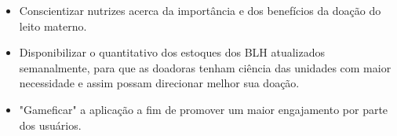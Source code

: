 \begin{itemize}
  \item Conscientizar nutrizes acerca da importância e dos benefícios da doação do leito materno.
  \item Disponibilizar o quantitativo dos estoques dos BLH atualizados semanalmente, para que as doadoras tenham ciência das unidades com maior necessidade e assim possam direcionar melhor sua doação.
  \item "Gameficar" a aplicação a fim de promover um maior engajamento por parte dos usuários.
\end{itemize}


